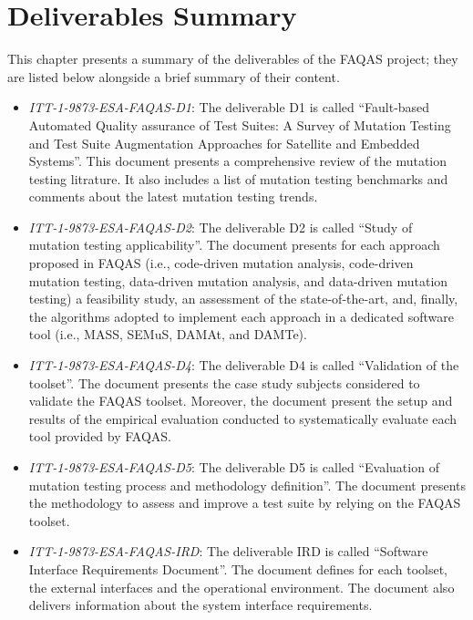 
\chapter{Deliverables Summary}

This chapter presents a summary of the deliverables of the FAQAS project; they are listed below alongside a brief summary of their content.

\begin{itemize}
	\item \emph{ITT-1-9873-ESA-FAQAS-D1}: The deliverable D1 is called ``Fault-based Automated Quality assurance of Test Suites: A Survey of Mutation Testing and Test Suite Augmentation Approaches for Satellite and Embedded Systems''. This document presents a comprehensive review of the mutation testing litrature. It also includes a list of mutation testing benchmarks and comments about the latest mutation testing trends.

	\item \emph{ITT-1-9873-ESA-FAQAS-D2}: The deliverable D2 is called ``Study of mutation testing applicability''. The document presents for each approach proposed in FAQAS (i.e., code-driven mutation analysis, code-driven mutation testing, data-driven mutation analysis, and data-driven mutation testing) a feasibility study, an assessment of the state-of-the-art, and, finally, the algorithms adopted to implement each approach in a dedicated software tool (i.e., MASS, SEMuS, DAMAt, and DAMTe). 

	\item \emph{ITT-1-9873-ESA-FAQAS-D4}: The deliverable D4 is called ``Validation of the toolset''. The document presents the case study subjects considered to validate the FAQAS toolset. Moreover, the document present the setup and results of the empirical evaluation conducted to systematically evaluate each tool provided by FAQAS. 

	\item \emph{ITT-1-9873-ESA-FAQAS-D5}: The deliverable D5 is called ``Evaluation of mutation testing process and methodology definition''. The document presents the methodology to assess and improve a test suite by relying on the FAQAS toolset. 

	\item \emph{ITT-1-9873-ESA-FAQAS-IRD}: The deliverable IRD is called ``Software Interface Requirements Document''. The document defines for each toolset, the external interfaces and the operational environment. The document also delivers information about the system interface requirements. 


\end{itemize}
